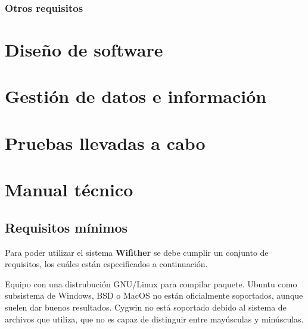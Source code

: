 \documentclass{article}
\begin{document}


        \subsubsection{Otros requisitos}



\section{Diseño de software}


\section{Gestión de datos e información}


\section{Pruebas llevadas a cabo}



\section{Manual técnico}
    \subsection{Requisitos mínimos}
        Para poder utilizar el sistema \textbf{Wifither} se debe cumplir un conjunto de requisitos, los cuáles están especificados a continuación.

        Equipo con una distrubución GNU/Linux para compilar paquete. Ubuntu como subsistema de Windows, BSD o MacOS no están oficialmente soportados, aunque suelen dar buenos resultados. Cygwin no está soportado debido al sistema de archivos que utiliza, que no es capaz de distinguir entre mayúsculas y minúsculas.
\end{document}
